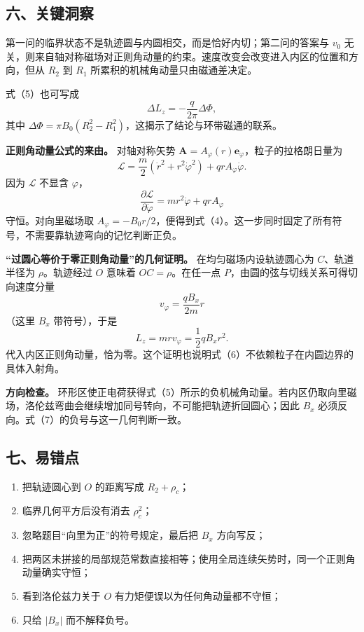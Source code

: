 \documentclass[12pt,a4paper,UTF8]{ctexart}
\newcommand{\tightlist}{\setlength{\itemsep}{0pt}\setlength{\parskip}{0pt}}
\begin{document}
\subsection{六、关键洞察}\label{ux516dux5173ux952eux6d1eux5bdf-2}

第一问的临界状态不是轨迹圆与内圆相交，而是恰好内切；第二问的答案与
\(v_0\)
无关，则来自轴对称磁场对正则角动量的约束。速度改变会改变进入内区的位置和方向，但从
\(R_2\) 到 \(R_1\) 所累积的机械角动量只由磁通差决定。

式（5）也可写成 \[
\Delta L_z=-\frac{q}{2\pi}\Delta\Phi,
\] 其中
\(\Delta\Phi=\pi B_0(R_2^2-R_1^2)\)，这揭示了结论与环带磁通的联系。

\textbf{正则角动量公式的来由。} 对轴对称矢势
\(\bm A=A_\varphi(r)\bm e_\varphi\)，粒子的拉格朗日量为 \[
\mathcal L=\frac m2(\dot r^2+r^2\dot\varphi^2)
+qrA_\varphi\dot\varphi.
\] 因为 \(\mathcal L\) 不显含 \(\varphi\)， \[
\frac{\partial\mathcal L}{\partial\dot\varphi}
=mr^2\dot\varphi+qrA_\varphi
\] 守恒。对向里磁场取
\(A_\varphi=-B_0r/2\)，便得到式（4）。这一步同时固定了所有符号，不需要靠轨迹弯向的记忆判断正负。

\textbf{``过圆心等价于零正则角动量''的几何证明。}
在均匀磁场内设轨迹圆心为 \(C\)、轨道半径为 \(\rho\)。轨迹经过 \(O\)
意味着 \(OC=\rho\)。在任一点 \(P\)，由圆的弦与切线关系可得切向速度分量
\[
v_\varphi=\frac{qB_x}{2m}r
\] （这里 \(B_x\) 带符号），于是 \[
L_z=mrv_\varphi=\frac12qB_xr^2.
\]
代入内区正则角动量，恰为零。这个证明也说明式（6）不依赖粒子在内圆边界的具体入射角。

\textbf{方向检查。}
环形区使正电荷获得式（5）所示的负机械角动量。若内区仍取向里磁场，洛伦兹弯曲会继续增加同号转向，不可能把轨迹折回圆心；因此
\(B_x\) 必须反向。式（7）的负号与这一几何判断一致。

\subsection{七、易错点}\label{ux4e03ux6613ux9519ux70b9-2}

\begin{enumerate}
\def\labelenumi{\arabic{enumi}.}
\tightlist
\item
  把轨迹圆心到 \(O\) 的距离写成 \(R_2+\rho_c\)；
\item
  临界几何平方后没有消去 \(\rho_c^2\)；
\item
  忽略题目``向里为正''的符号规定，最后把 \(B_x\) 方向写反；
\item
  把两区未拼接的局部规范常数直接相等；使用全局连续矢势时，同一个正则角动量确实守恒；
\item
  看到洛伦兹力关于 \(O\) 有力矩便误以为任何角动量都不守恒；
\item
  只给 \(|B_x|\) 而不解释负号。
\end{enumerate}
\end{document}
